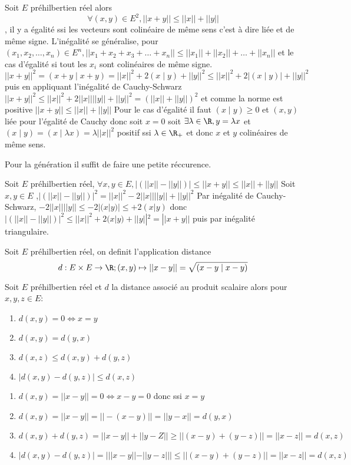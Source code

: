 \begin{prop}
    Soit $E$ préhilbertien réel alors $$\forall (x,y)\in E^2,     ||x+y||\leq ||x||+||y||$$, il y a égalité ssi les vecteurs sont colinéaire de même sens c'est à dire liée et de même signe.
    L'inégalité se généralise, pour $(x_1,x_2,\dots,x_n)\in E^n,||x_1 +x_2+x_3+\dots+x_n||\leq ||x_1||+||x_2||+\dots + ||x_n||$ et le cas d'égalité si tout les $x_i$ sont colinéaires de même signe.
    \tcblower
    $||x+y||^2=(x+y\mid x+y)=||x||^2+2(x\mid y)+||y||^2\leq ||x||^2+2|(x\mid y)|+||y||^2$ puis en appliquant l'inégalité de Cauchy-Schwarz $||x+y||^2\leq ||x||^2+2||x||||y||+||y||^2=(||x||+||y||)^2$ et comme la norme est positive $||x+y||\leq ||x||+||y||$
    Pour le cas d'égalité il faut $(x\mid y)\geq 0$ et $(x,y)$ liée pour l'égalité de Cauchy donc soit $x=0$ soit $\exists \lambda \in \R, y=\lambda x$ et $(x\mid y)=(x\mid \lambda x)=\lambda ||x||^2$ positif ssi $\lambda\in \R_+$ et donc $x$ et $y$ colinéaires de même sens.

    Pour la génération il suffit de faire une petite réccurence.
\end{prop}
\begin{prop}
    Soit $E$ préhilbertien réel, $\forall x,y\in E,|(||x||-||y||)|\leq ||x+y||\leq ||x||+||y||$
    \tcblower
    Soit $x,y\in E$ ,$|(||x||-||y||)|^2=||x||^2-2||x||||y||+||y||^2$ Par inégalité de Cauchy-Schwarz, $-2||x||||y||\leq-2|(x|y)|\leq +2(x|y)$ donc $|(||x||-||y||)|^2\leq ||x||^2+2(x|y)+||y||^2=||x+y||$ puis par inégalité triangulaire.
\end{prop}
\begin{defini}
    Soit $E$ préhilbertien réel, on definit l'application distance $$d: E \times E \to \R; (x,y)\mapsto ||x-y||=\sqrt{(x-y\mid x-y)}$$
\end{defini}
\begin{prop}
    Soit $E$ préhilbertien réel et $d$ la distance associé au produit scalaire alors pour $x,y,z\in E$:
    \begin{enumerate}
        \item $d(x,y)=0\iff x=y$
        \item $d(x,y)=d(y,x)$
        \item $d(x,z)\leq d(x,y)+d(y,z)$
        \item $|d(x,y)-d(y,z)|\leq d(x,z)$
    \end{enumerate}
    \tcblower
    \begin{enumerate}
        \item $d(x,y)=||x-y||=0\iff x-y = 0 $ donc ssi $x=y$
        \item $d(x,y)=||x-y||=||-(x-y)||=||y-x||=d(y,x)$
        \item $d(x,y)+d(y,z)=||x-y||+||y-Z||\geq ||(x-y)+(y-z)||=||x-z||=d(x,z)$
        \item $|d(x,y)-d(y,z)|=| ||x-y||-||y-z|||\leq ||(x-y)+(y-z)||=||x-z||=d(x,z)$
    \end{enumerate}
\end{prop}
